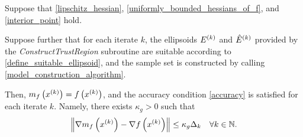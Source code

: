 \begin{theorem}
\label{linear_accuracy_is_satisfied}

Suppose that \cref{lipschitz_hessian}, \cref{uniformly_bounded_hessians_of_f}, and \cref{interior_point} hold.

Suppose further that for each iterate $k$, the ellipsoids ${E^{(k)}}$ and ${{\hat E}^{(k)}}$ provided by the \emph{ConstructTrustRegion} subroutine 
are suitable according to \cref{define_suitable_ellipsoid},
and the sample set is constructed by calling \cref{model_construction_algorithm}.



Then, $m_f\left(x^{(k)}\right) = f\left(x^{(k)}\right)$, and
the accuracy condition \cref{accuracy} is satisfied for each iterate $k$.
Namely, there exists $\kappa_{g} > 0$ such that 
\begin{align*}
\left\|\nabla m_f\left(x^{(k)}\right) - \nabla f\left(x^{(k)}\right)\right\| \le \kappa_g \Delta_k \quad \forall k \in \mathbb N.
\end{align*}
\end{theorem}

